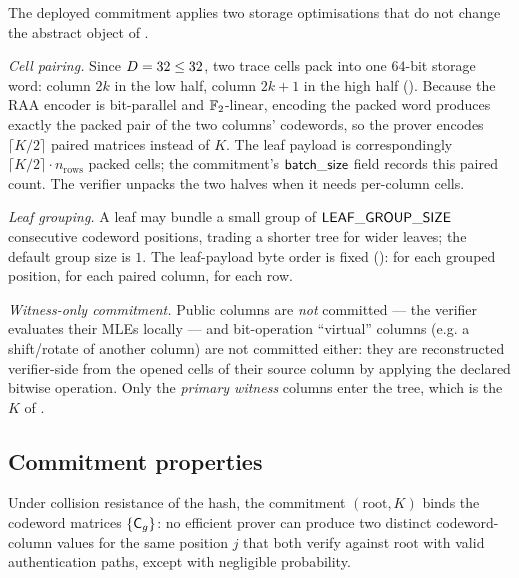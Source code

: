 \begin{remark}
\label{rem:storage}
The deployed commitment applies two storage optimisations that do not
change the abstract object of .

\emph{Cell pairing.} Since $D = 32 \le 32$, two trace cells pack into
one $64$-bit storage word: column $2k$ in the low half, column $2k+1$ in
the high half (). Because the RAA encoder is
bit-parallel and $\mathbb{F}_2$-linear, encoding the packed word produces exactly
the packed pair of the two columns' codewords, so the prover encodes
$\lceil K/2\rceil$ paired matrices instead of $K$. The leaf payload is
correspondingly $\lceil K/2 \rceil \cdot n_{\mathrm{rows}}$ packed cells;
the commitment's $\mathsf{batch\_size}$ field records this paired count. The
verifier unpacks the two halves when it needs per-column cells.

\emph{Leaf grouping.} A leaf may bundle a small group of
$\mathsf{LEAF\_GROUP\_SIZE}$ consecutive codeword positions, trading a
shorter tree for wider leaves; the default group size is $1$. The
leaf-payload byte order is fixed ():
for each grouped position, for each paired column, for each row.

\emph{Witness-only commitment.} Public columns are \emph{not} committed
--- the verifier evaluates their MLEs locally --- and bit-operation
``virtual'' columns (e.g. a shift/rotate of another column) are not
committed either: they are reconstructed verifier-side from the opened
cells of their source column by applying the declared bitwise operation.
Only the \emph{primary witness} columns enter the tree, which is the $K$
of .
\end{remark}

\subsection{Commitment properties}

\begin{proposition}[Binding]
\label{prop:binding}
Under collision resistance of the hash, the commitment
$(\mathrm{root}, K)$ binds the codeword matrices $\{\mathsf{C}_g\}$: no
efficient prover can produce two distinct codeword-column values for the
same position $j$ that both verify against $\mathrm{root}$ with valid
authentication paths, except with negligible probability.
\end{proposition}

